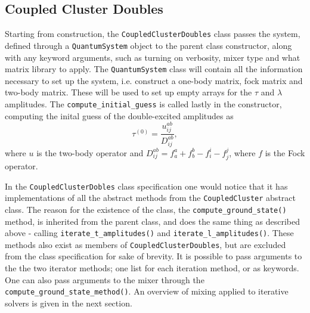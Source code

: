     \subsection{Coupled Cluster Doubles}
    
    Starting from construction, the \lstinline{CoupledClusterDoubles} class passes 
    the system, defined through a \lstinline{QuantumSystem} object to the 
    parent class constructor, along with any keyword arguments, such as turning 
    on verbosity, mixer type and what matrix library to apply. The
    \lstinline{QuantumSystem} class will contain all the information necessary to 
    set up the system, i.e. construct a one-body matrix, fock matrix and two-body 
    matrix. These will be used to set up empty arrays for the $\tau$ and $\lambda$ 
    amplitudes. The \lstinline{compute_initial_guess} is called lastly in the 
    constructor, computing the inital guess of the double-excited amplitudes as 
    \begin{equation}
        \label{eq:ccd_inital_guess}
        \tau^{(0)} = \frac{u^{ab}_{ij}}{D^{ab}_{ij}},
    \end{equation}
    where $u$ is the two-body operator and
    $D^{ab}_{ij} = f^a_a + f^b_b - f^i_i - f^j_j$,
    where $f$ is the Fock operator.
    
    In the \lstinline{CoupledClusterDobles} class specification one would
    notice that it has implementations of all the abstract methods 
    from the \lstinline{CoupledCluster} abstract class. The reason for the existence 
    of the class, the \lstinline{compute_ground_state()} method, is inherited from the 
    parent class, and does the same thing as described above - calling 
    \lstinline{iterate_t_amplitudes()} and \lstinline{iterate_l_amplitudes()}. These 
    methods also exist as members of \lstinline{CoupledClusterDoubles}, but are excluded 
    from the class specification for sake of brevity. It is 
    possible to pass arguments to the the two iterator methods; one list for each iteration
    method, or as keywords.
    One can also pass arguments 
    to the mixer through the \lstinline{compute_ground_state_method()}. 
    An overview of mixing applied to iterative solvers is given in the next 
    section.

